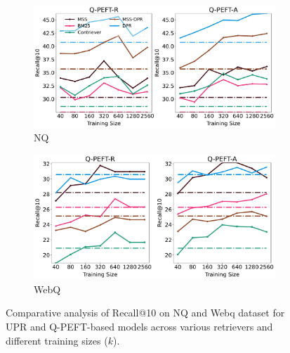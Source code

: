 \documentclass[sigconf,natbib=true,anonymous=false]{acmart}
\begin{document}
\begin{figure}[!htbp]
    \centering
    \begin{subfigure}[b]{0.46\textwidth}
        \includegraphics[width=\textwidth]{Figures/r_retriever_k_multi_nq_2D.pdf}
        \caption{NQ}
        \label{fig:nq}
    \end{subfigure}
    
    \begin{subfigure}[b]{0.46\textwidth}
        \includegraphics[width=\textwidth]{Figures/r_retriever_k_multi_webq_2D.pdf}
        \caption{WebQ}
        \label{fig:webq}
    \end{subfigure}
    

    \caption{Comparative analysis of Recall@10 on NQ and Webq dataset for UPR and Q-PEFT-based models across various retrievers and different training sizes ($k$).}
    \label{fig: training_size}
\end{figure}
\end{document}
